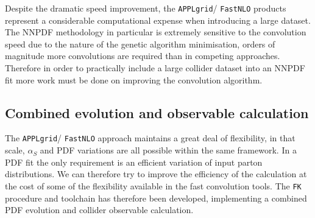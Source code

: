 Despite the dramatic speed improvement, the { \tt APPLgrid}/{ \tt FastNLO} products represent a considerable computational expense when introducing a large dataset. The NNPDF methodology in particular is extremely sensitive to the convolution speed due to the nature of the genetic algorithm minimisation, orders of magnitude more convolutions are required than in competing approaches. Therefore in order to practically include a large collider dataset into an NNPDF fit more work must be done on improving the convolution algorithm.

\subsection{Combined evolution and observable calculation}
The { \tt APPLgrid}/{ \tt FastNLO} approach maintains a great deal of flexibility, in that scale, $\alpha_S$ and PDF variations are all possible within the same framework. In a PDF fit the only requirement is an efficient variation of input parton distributions. We can therefore try to improve the efficiency of the calculation at the cost of some of the flexibility available in the fast convolution tools. The {\tt FK} procedure and toolchain has therefore been developed, implementing a combined PDF evolution and collider observable calculation.

